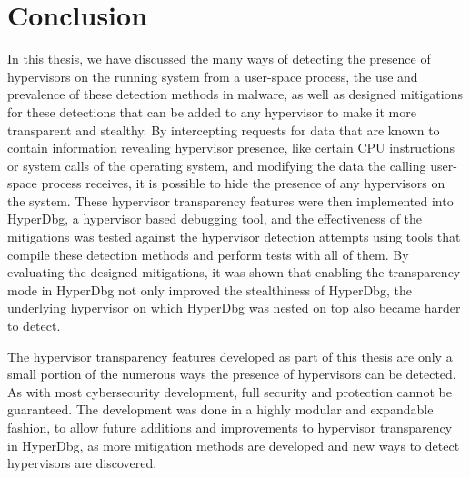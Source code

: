 \section{Conclusion}\label{s:conclusion}

In this thesis, we have discussed the many ways of detecting the presence of hypervisors on the running system from a user-space process, 
the use and prevalence of these detection methods in malware, as well as designed mitigations for these detections that can be added to any hypervisor to make it more transparent and stealthy. 
By intercepting requests for data that are known to contain information revealing hypervisor presence, like certain CPU instructions or system calls of the operating system, 
and modifying the data the calling user-space process receives, it is possible to hide the presence of any hypervisors on the system. 
These hypervisor transparency features were then implemented into HyperDbg, a hypervisor based debugging tool, and the effectiveness of the mitigations was 
tested against the hypervisor detection attempts using tools that compile these detection methods and perform tests with all of them. By evaluating the designed mitigations, 
it was shown that enabling the transparency mode in HyperDbg not only improved the stealthiness of HyperDbg, the underlying hypervisor on which HyperDbg was nested on top also 
became harder to detect.

The hypervisor transparency features developed as part of this thesis are only a small portion of the numerous ways the presence of hypervisors can be detected. 
As with most cybersecurity development, full security and protection cannot be guaranteed. The development was done in a highly modular and expandable fashion, 
to allow future additions and improvements to hypervisor transparency in HyperDbg, as more mitigation methods are developed and new ways to detect hypervisors are discovered. 



